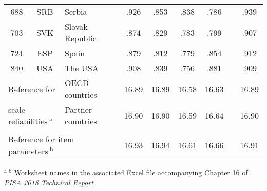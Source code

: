 {\begin{tabular}{ccl c@{\hskip 1cm} cccc c@{\hskip 1cm} c}
    688   & SRB   & Serbia &       & .926 & .853 & .838 & .786 &       & .939 \\
    703   & SVK   & Slovak Republic &       & .874 & .829 & .783 & .799 &       & .907 \\
    724   & ESP   & Spain &       & .879 & .812 & .779 & .854 &       & .912 \\
    840   & USA   & The USA &       & .908 & .839 & .756 & .881 &       & .909 \\
    \midrule
    \multicolumn{2}{l}{Reference for} & \multicolumn{1}{l}{OECD countries} & & \textsf{16.89} & \textsf{16.89} & \textsf{16.58} & \textsf{16.63} &       & \textsf{16.89} \\
    \multicolumn{2}{l}{scale reliabilities$\ ^\text{a}$} & \multicolumn{1}{l}{Partner countries} & & \textsf{16.90} & \textsf{16.90} & \textsf{16.59} & \textsf{16.64} &       & \textsf{16.90} \\
    &&&&&&&&&\\
    \multicolumn{3}{l}{Reference for item parameters$\ ^\text{b}$} & & \textsf{16.93} & \textsf{16.94} & \textsf{16.61} & \textsf{16.66} & & \textsf{16.91}\\
    \bottomrule
    \end{tabular}
}{$^\text{a}\ ^\text{b}$ Worksheet names in the associated \href{https://www.oecd.org/pisa/data/pisa2018technicalreport/PISA2018_Technical_Report_chapter-16_Background_Questionnaires.xlsx}{Excel file} accompanying Chapter 16 of \textit{PISA 2018 Technical Report} \parencite{PISAtech}.}

